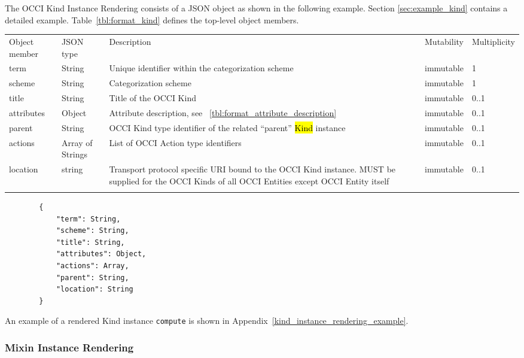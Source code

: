 \documentclass[10pt,a4paper]{article}
\begin{document}
The OCCI Kind Instance Rendering consists of a JSON object as shown in the
following example. Section \ref{sec:example_kind} contains a detailed example.
Table~\ref{tbl:format_kind} defines the top-level object members.

 {
    \begin{tabularx}{\textwidth}{llXll}
    \toprule
    Object member & JSON type & Description & Mutability & Multiplicity \\
    \colrule
    term & String & Unique identifier within the categorization scheme &
immutable & 1 \\

    scheme & String & Categorization scheme & immutable & 1 \\

    title & String & Title of the OCCI Kind & immutable & 0..1 \\

    attributes & Object & Attribute description, see
~\ref{tbl:format_attribute_description} & immutable & 0..1 \\

    parent & String & OCCI Kind type identifier of the
related ``parent'' \hl{Kind} instance & immutable & 0..1 \\

    actions & Array of Strings & List of OCCI Action type
identifiers & immutable & 0..1 \\

    location & string & Transport protocol specific URI bound to the OCCI Kind
instance. MUST be supplied for the OCCI Kinds of all OCCI Entities except OCCI
Entity itself & immutable & 0..1 \\
    \botrule
    \end{tabularx}
}

\begin{lstlisting}
        {
            "term": String,
            "scheme": String,
            "title": String,
            "attributes": Object,
            "actions": Array,
            "parent": String,
            "location": String
        }
\end{lstlisting}

An example of a rendered Kind instance \texttt{compute} is shown in Appendix~\ref{kind_instance_rendering_example}.


\subsubsection{Mixin Instance Rendering}
\label{sec:format_mixin}
\end{document}

